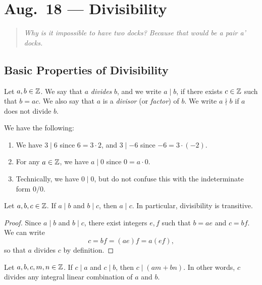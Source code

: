 \chapter{Aug.~18 --- Divisibility}

\begin{quote}
  \emph{Why is it impossible to have two docks? Because that would be a pair a' docks.}
\end{quote}

\section{Basic Properties of Divisibility}

\begin{definition}
  Let $a, b \in \mathbb{Z}$. We say that
  $a$ \emph{divides} $b$, and we write
  $a \mid b$, if there exists $c \in \mathbb{Z}$
  such that $b = ac$. We also say that
  $a$ is a \emph{divisor} (or \emph{factor})
  of $b$. We write
  $a \nmid b$ if $a$ does not divide $b$.
\end{definition}

\begin{example} We have the following:
  \begin{enumerate}
    \item We have $3 \mid 6$ since
      $6 = 3 \cdot 2$, and $3 \mid -6$ since
      $-6 = 3 \cdot (-2)$.
    \item For any $a \in \mathbb{Z}$, we have $a \mid 0$
      since $0 = a \cdot 0$.
    \item Technically, we have
      $0 \mid 0$, but do not confuse this
      with the indeterminate form $0 / 0$.
  \end{enumerate}
\end{example}

\begin{prop}
  Let $a, b, c \in \mathbb{Z}$. If $a \mid b$ and
  $b \mid c$, then $a \mid c$. In particular,
  divisibility is transitive.
\end{prop}

\begin{proof}
  Since $a \mid b$ and $b \mid c$, there
  exist integers $e, f$ such that
  $b = ae$ and $c = bf$. We can write
  \[
    c = bf = (ae)f = a(ef),
  \]
  so that $a$ divides $c$ by definition.
\end{proof}

\begin{prop}
  Let $a, b, c, m, n \in \mathbb{Z}$. If $c \mid a$
  and $c \mid b$, then $c \mid (am + bn)$. In
  other words, $c$ divides any integral
  linear combination of $a$ and $b$.
\end{prop}

